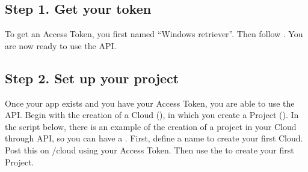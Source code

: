 \documentclass[a4paper,12pt,english]{sphinxmanual}
\begin{document}
\subsection{Step 1. Get your token}
\label{\detokenize{tutorials/retrieve-elements:step-1-get-your-token}}
To get an Access Token, you first  named “Windows retriever”.
Then follow .
You are now ready to use the API.


\subsection{Step 2. Set up your project}
\label{\detokenize{tutorials/retrieve-elements:step-2-set-up-your-project}}
Once your app exists and you have your Access Token, you are able to use the API.
Begin with the creation of a Cloud (), in which you create a Project ().
In the script below, there is an example of the creation of a project in your Cloud through API, so you can have a .
First, define a name to create your first Cloud. Post this  on /cloud using your Access Token.
Then use the  to create your first Project.
\end{document}
